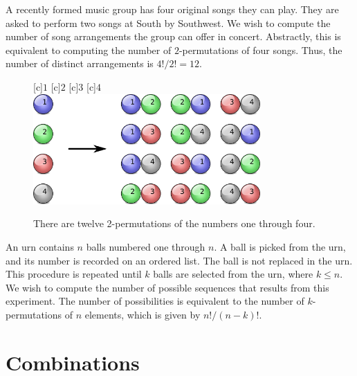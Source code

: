 \begin{example}
A recently formed music group has four original songs they can play.
They are asked to perform two songs at South by Southwest.
We wish to compute the number of song arrangements the group can offer in concert.
Abstractly, this is equivalent to computing the number of $2$-permutations of four songs.
Thus, the number of distinct arrangements is ${4!}/{2!} = 12$.
\end{example}

\begin{figure}[htb!]
\begin{center}
\begin{psfrags}
[c]{$1$}
[c]{$2$}
[c]{$3$}
[c]{$4$}
\includegraphics[height=4.215cm]{Figures/4Chapter/kpermutation}
\end{psfrags}
\caption{There are twelve 2-permutations of the numbers one through four.}
\label{figure:Kpermutation}
\end{center}
\end{figure}

\begin{example}
An urn contains $n$ balls numbered one through $n$.
A ball is picked from the urn, and its number is recorded on an ordered list.
The ball is not replaced in the urn.
This procedure is repeated until $k$ balls are selected from the urn, where $k \leq n$.
We wish to compute the number of possible sequences that results from this experiment.
The number of possibilities is equivalent to the number of $k$-permutations of $n$ elements, which is given by $n! / (n-k)!$.
\end{example}


\section{Combinations}

